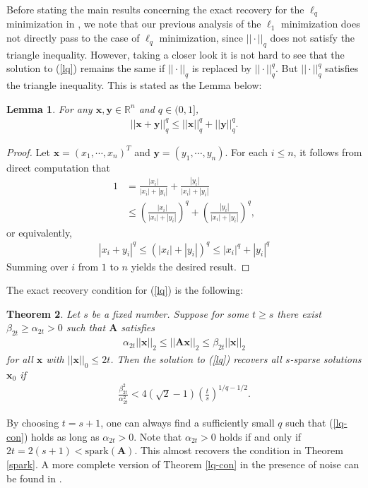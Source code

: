 \documentclass[11pt]{article}
\numberwithin{equation}{section}
\theoremstyle{plain}
\newtheorem{Th}{Theorem}[section]
\newtheorem{Lemma}[Th]{Lemma}
\theoremstyle{definition}
\def\R{{\mathbb R}}
\def\R{{\mathbb R}}
\def\A{{\mathbf A}}
\def\x{{\mathbf x}}
\def\y{{\mathbf{y}}}
\begin{document}
Before stating the main results concerning the exact recovery for the $\ell_q$ minimization in \cite{foucart2009sparsest}, we note that our previous analysis of the $\ell_1$ minimization does not directly pass to the case of $\ell_q$ minimization, since $|| \cdot||_q$ does not satisfy the triangle inequality. However, taking a closer look it is not hard to see that the solution to (\ref{lq}) remains the same if $|| \cdot||_q$ is replaced by $|| \cdot||_q^q$. But $|| \cdot||_q^q$ satisfies the triangle inequality. This is stated as the Lemma below:
\begin{Lemma}\label{tau-triangle}
For any $\x, \y\in\R^n$ and $q\in (0,1]$, 
\begin{align*}
||\x+\y||_q^q\leq ||\x||_q^q+||\y||_q^q. 
\end{align*} 
\end{Lemma}  
\begin{proof}
Let $\x=(x_1, \cdots, x_n)^T$ and $\y=(y_1, \cdots, y_n)$. For each $i\leq n$, it follows from direct computation that
\begin{align*}
1&=\frac{|x_i|}{|x_i|+|y_i|}+\frac{|y_i|}{|x_i|+|y_i|}\\
&\leq\left(\frac{|x_i|}{|x_i|+|y_i|}\right)^q+\left(\frac{|y_i|}{|x_i|+|y_i|}\right)^q,
\end{align*}
or equivalently,
\begin{align*}
|x_i+y_i|^q\leq (|x_i|+|y_i|)^q\leq |x_i|^q+|y_i|^q
\end{align*}
Summing over $i$ from $1$ to $n$ yields the desired result.  
\end{proof}
The exact recovery condition for (\ref{lq})
is the following:
\begin{Th}\label{lq recovery}
Let $s$ be a fixed number. Suppose for some $t\geq s$ there exist $\beta_{2t}\geq\alpha_{2t}>0$ such that $\A$ satisfies 
\begin{align*}
\alpha_{2t}||\x||_2\leq ||\A\x||_2\leq\beta_{2t} ||\x||_2
\end{align*}
for all $\x$ with $||\x||_0\leq 2t$. Then the solution to (\ref{lq}) recovers all $s$-sparse solutions $\x_0$ if
\begin{align}
\frac{\beta_{2t}^2}{\alpha_{2t}^2}<4(\sqrt{2}-1)\left(\frac{t}{s}\right)^{1/q-1/2}.\label{lq-con}
\end{align} 
\end{Th}
By choosing $t=s+1$, one can always find a sufficiently small $q$ such that (\ref{lq-con}) holds as long as $\alpha_{2t}>0$. Note that $\alpha_{2t}>0$ holds if and only if $2t=2(s+1)<\text{spark}(\A)$. This almost recovers the condition in Theorem \ref{spark}. A more complete version of Theorem \ref{lq-con} in the presence of noise can be found in \cite{foucart2009sparsest}.  
\end{document}
